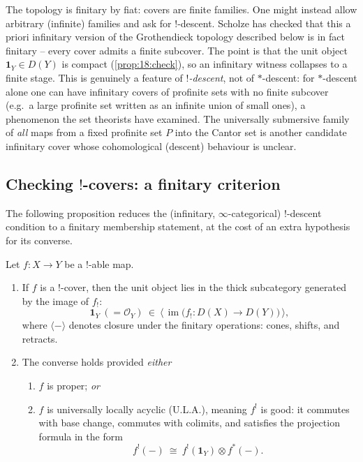 \begin{remark}
\label{rmk:18:finitary}
The topology is finitary by fiat: covers are finite families. One might instead
allow arbitrary (infinite) families and ask for $!$-descent. Scholze has checked
that this a priori infinitary version of the Grothendieck topology described below
is in fact finitary -- every cover admits a finite subcover. The point is that the
unit object $\mathbf 1_Y\in D(Y)$ is compact (\cref{prop:18:check}), so an
infinitary witness collapses to a finite stage. This is genuinely a feature of
\emph{$!$-descent}, not of $*$-descent: for $*$-descent alone one can have
infinitary covers of profinite sets with no finite subcover (e.g.\ a large
profinite set written as an infinite union of small ones), a phenomenon the set
theorists have examined. The universally submersive family of \emph{all} maps from
a fixed profinite set $P$ into the Cantor set is another candidate infinitary
cover whose cohomological (descent) behaviour is unclear.
\end{remark}

\subsection{Checking \texorpdfstring{$!$}{!}-covers: a finitary criterion}
\label{subsec:18:checking}

The following proposition reduces the (infinitary, $\infty$-categorical)
$!$-descent condition to a finitary membership statement, at the cost of an extra
hypothesis for its converse.

\begin{proposition}
\label{prop:18:check}
Let $f\colon X\to Y$ be a $!$-able map.
\begin{enumerate}
\item If $f$ is a $!$-cover, then the unit object lies in the thick subcategory
generated by the image of $f_!$:
\begin{equation}
\label{eq:18:unit-in-thick}
\mathbf 1_Y\ (=\mathcal O_Y)\ \in\ \bigl\langle\,\operatorname{im}\bigl(f_!\colon D(X)\to D(Y)\bigr)\,\bigr\rangle,
\end{equation}
where $\langle-\rangle$ denotes closure under the finitary operations: cones,
shifts, and retracts.
\item The converse holds provided \emph{either}
\begin{enumerate}
\item[\textup{(a)}] $f$ is proper; \emph{or}
\item[\textup{(b)}] $f$ is universally locally acyclic \textup{(U.L.A.)}, meaning
$f^!$ is good: it commutes with base change, commutes with colimits, and satisfies
the projection formula in the form
\begin{equation*}
f^!(-)\ \cong\ f^!(\mathbf 1_Y)\otimes f^*(-).
\end{equation*}
\end{enumerate}
\end{enumerate}
\end{proposition}

